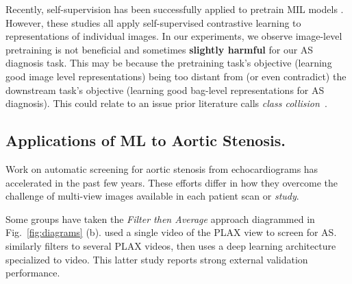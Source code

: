 Recently, self-supervision has been successfully applied to pretrain MIL models \citep{holste2022self, holste2022automated, liu2022multiple, lu2019semi, li2021dual, saillard2021self, dehaene2020self, rymarczyk2023protomil}. However, these studies all apply self-supervised contrastive learning to representations of individual images.
In our experiments, we observe image-level pretraining is not beneficial and sometimes \textbf{slightly harmful} for our AS diagnosis task.
This may be because the pretraining task's objective (learning good image level representations) being too distant from (or even contradict) the downstream task's objective (learning good bag-level representations for AS diagnosis). This could relate to an issue prior literature calls \emph{class collision}~\citep{arora2019theoretical, chuang2020debiased, khosla2020supervised, dwibedi2021little, zheng2021weakly, ash2021investigating, li2021comatch}. 






\subsection{Applications of ML to Aortic Stenosis.}

Work on automatic screening for aortic stenosis from echocardiograms has accelerated in the past few years. These efforts differ in how they overcome the challenge of multi-view images available in each patient scan or \emph{study}.

Some groups have taken the \emph{Filter then Average} approach diagrammed in Fig.~\ref{fig:diagrams} (b). 
\citet{dai2023identifying} used a single video of the PLAX view to screen for AS.
\citet{holste2022automated} similarly filters to several PLAX videos, then uses a deep learning architecture specialized to video.
This latter study reports strong external validation performance. 

